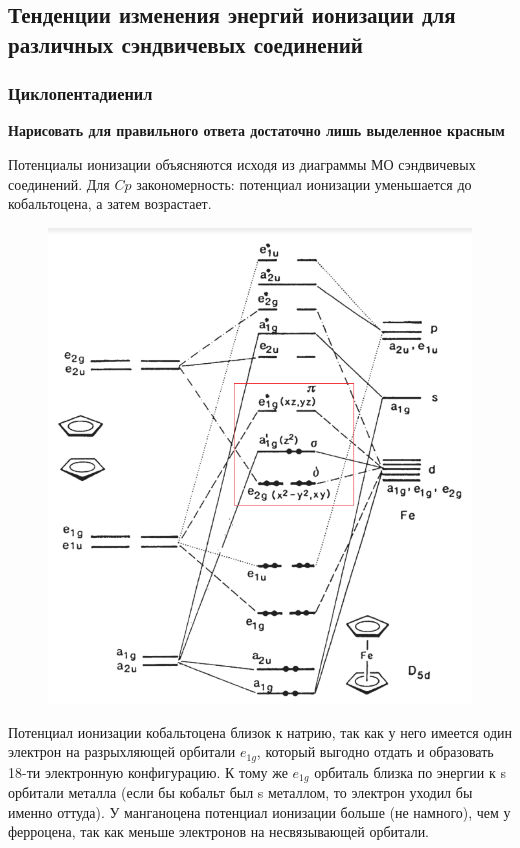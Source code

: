 \subsection{Тенденции изменения энергий ионизации для различных сэндвичевых соединений}
\subsubsection*{Циклопентадиенил}
\textbf{Нарисовать для правильного ответа достаточно лишь выделенное красным}

Потенциалы ионизации объясняются исходя из диаграммы МО сэндвичевых соединений. Для $Cp$ закономерность: потенциал ионизации уменьшается до кобальтоцена, а затем возрастает. 


\begin{figure}[H]
\centering
\includegraphics[scale=.600]{images/Cp2Feorb.png}
\end{figure}

Потенциал ионизации кобальтоцена близок к натрию, так как у него имеется один электрон на разрыхляющей орбитали $e_{1g}$, который выгодно отдать и образовать 18-ти электронную конфигурацию. К тому же $e_{1g}$ орбиталь близка по энергии к s орбитали металла (если бы кобальт был s металлом, то электрон уходил бы именно оттуда). 
У манганоцена потенциал ионизации больше (не намного), чем у ферроцена, так как меньше электронов на несвязывающей орбитали.


